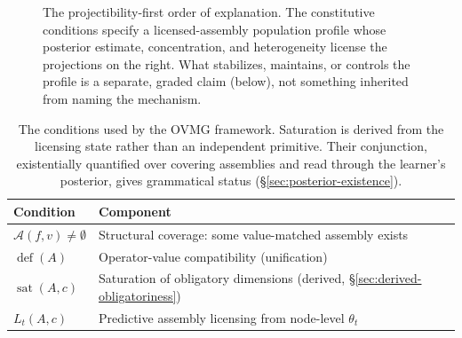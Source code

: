 \documentclass[12pt,letterpaper]{article}
\begin{document}
\begin{figure}[t]
\centering
{}
\caption{The projectibility-first order of explanation. The constitutive conditions specify a licensed-assembly population profile whose posterior estimate, concentration, and heterogeneity license the projections on the right. What stabilizes, maintains, or controls the profile is a separate, graded claim (below), not something inherited from naming the mechanism.}
\label{fig:profile-spine}
\end{figure}

\begin{table}[H]
\centering
\begin{tabular}{@{}ll@{}}
\toprule
Condition & Component \\
\midrule
$\mathcal{A}(f,v)\neq\emptyset$ & Structural coverage: some value-matched assembly exists \\
$\operatorname{def}(A)$ & Operator-value compatibility (unification) \\
$\operatorname{sat}(A,c)$ & Saturation of obligatory dimensions (derived, \S\ref{sec:derived-obligatoriness}) \\
$L_t(A,c)$ & Predictive assembly licensing from node-level $\theta_t$ \\
\bottomrule
\end{tabular}
\caption{The conditions used by the OVMG framework. Saturation is derived from
the licensing state rather than an independent primitive. Their conjunction,
existentially quantified over covering assemblies and read through the learner's
posterior, gives grammatical status (\S\ref{sec:posterior-existence}).}
\label{tab:vars}
\end{table}
\end{document}
